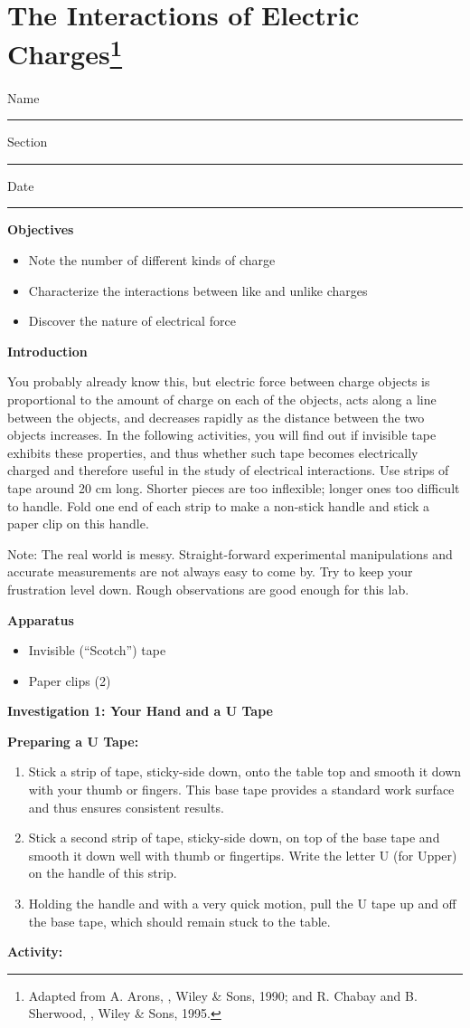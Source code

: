 
\section{The Interactions of Electric Charges\footnote{%
Adapted from A. Arons, ,
Wiley \& Sons, 1990; and R. Chabay and B. Sherwood, , Wiley \& Sons, 1995.
}}

Name \rule{2.0in}{0.1pt}\hfill{}Section \rule{1.0in}{0.1pt}\hfill{}Date
\rule{1.0in}{0.1pt}

\textbf{Objectives}

\begin{itemize}
\item Note the number of different kinds of charge
\item Characterize the interactions between like and unlike charges
\item Discover the nature of electrical force
\end{itemize}
\textbf{Introduction}

You probably already know this, but electric force between charge
objects is proportional to the amount of charge on each of the objects,
acts along a line between the objects, and decreases rapidly as the
distance between the two objects increases. In the following activities,
you will find out if invisible tape exhibits these properties, and
thus whether such tape becomes electrically charged and therefore
useful in the study of electrical interactions. Use strips of tape
around 20 cm long. Shorter pieces are too inflexible; longer ones
too difficult to handle. Fold one end of each strip to make a non-stick
handle and stick a paper clip on this handle.

Note: The real world is messy. Straight-forward experimental manipulations
and accurate measurements are not always easy to come by. Try to keep
your frustration level down. Rough observations are good enough for
this lab.

\textbf{Apparatus}

\begin{itemize}
\item Invisible ({}``Scotch'') tape
\item Paper clips (2)
\end{itemize}
\textbf{Investigation 1: Your Hand and a U Tape}

\textbf{Preparing a U Tape:}

\begin{enumerate}
\item Stick a strip of tape, sticky-side down, onto the table top and smooth
it down with your thumb or fingers. This base tape provides a standard
work surface and thus ensures consistent results.
\item Stick a second strip of tape, sticky-side down, on top of the base
tape and smooth it down well with thumb or fingertips. Write the letter
U (for Upper) on the handle of this strip.
\item Holding the handle and with a very quick motion, pull the U tape up
and off the base tape, which should remain stuck to the table.
\end{enumerate}
\textbf{Activity:}

